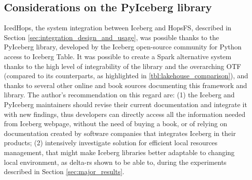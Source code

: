 \subsection{Considerations on the PyIceberg library}
IcedHops, the system integration between Iceberg and \gls{HopsFS}, described in Section \ref{sec:integration_design_and_usage}, was possible thanks to the PyIceberg library, developed by the Iceberg open-source community for Python access to Iceberg Table. It was possible to create a Spark alternative system thanks to the high level of integrability of the library and the overarching \gls{OTF} (compared to its counterparts, as highlighted in \ref{tbl:lakehouse_comparison}), and thanks to several other online and book sources documenting this framework and library. The author's recommendation on this regard are: (1) the Iceberg and PyIceberg maintainers should revise their current documentation and integrate it with new findings, thus developers can directly access all the information needed from Iceberg webpage, without the need of buying a book, or of relying on documentation created by software companies that integrates Iceberg in their products; (2) intensively investigate solution for efficient local resources management, that might make Iceberg libraries better adaptable to changing local environment, as delta-rs shown to be able to, during the experiments described in Section \ref{sec:major_results}.